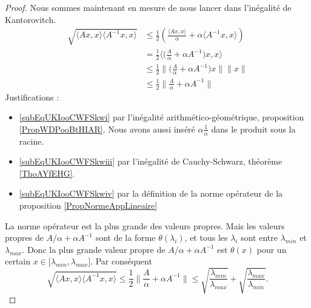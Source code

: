 \begin{proof}
    Nous sommes maintenant en mesure de nous lancer dans l'inégalité de Kantorovitch.
    \begin{subequations}
        \begin{align}
            \sqrt{\langle Ax, x\rangle \langle A^{-1}x, x\rangle }&\leq\frac{ 1 }{2}\left( \frac{ \langle Ax, x\rangle  }{ \alpha }+\alpha\langle A^{-1}x, x\rangle  \right)\label{subEqUKIooCWFSkwi}\\
            &=\frac{ 1 }{2}\langle   \big( \frac{ A }{ \alpha }+\alpha A^{-1} \big)x , x\rangle \\
            &\leq\frac{ 1 }{2}\Big\| \big( \frac{ A }{ \alpha }+\alpha A^{-1} \big)x \|\| x \| \label{subEqUKIooCWFSkwiii}\\
            &\leq \frac{ 1 }{2}\| \frac{ A }{ \alpha }+\alpha A^{-1} \| \label{subEqUKIooCWFSkwiv}
        \end{align}
    \end{subequations}
    Justifications :
    \begin{itemize}
        \item \ref{subEqUKIooCWFSkwi} par l'inégalité arithmético-géométrique, proposition \ref{PropWDPooBtHIAR}. Nous avons aussi inséré \( \alpha\frac{1}{ \alpha }\) dans le produit sous la racine.
        \item \ref{subEqUKIooCWFSkwiii} par l'inégalité de Cauchy-Schwarz, théorème \ref{ThoAYfEHG}.
        \item \ref{subEqUKIooCWFSkwiv} par la définition de la norme opérateur de la proposition \ref{PropNormeAppLineaire}
    \end{itemize}
    La norme opérateur est la plus grande des valeurs propres. Mais les valeurs propres de \( A/\alpha+\alpha A^{-1}\) sont de la forme \( \theta(\lambda_i)\), et tous les \( \lambda_i\) sont entre \( \lambda_{min} \) et \( \lambda_{max}\). Donc la plus grande valeur propre de \( A/\alpha+\alpha A^{-1}\) est \( \theta(x)\) pour un certain \( x\in\mathopen[ \lambda_{min} , \lambda_{max} \mathclose]\). Par conséquent
    \begin{equation}
            \sqrt{\langle Ax, x\rangle \langle A^{-1}x, x\rangle }\leq \frac{ 1 }{2}\| \frac{ A }{ \alpha }+\alpha A^{-1} \| \leq \sqrt{\frac{ \lambda_{min} }{ \lambda_{max} }}+\sqrt{\frac{ \lambda_{max} }{ \lambda_{min} }}.
    \end{equation}
\end{proof}
